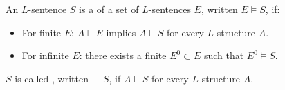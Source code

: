 An $L$-sentence $S$ is a  of a set of $L$-sentences $E$, written $E \vDash S$, if:
\begin{itemize}
\item For finite $E$: $A \vDash E$ implies $A \vDash S$ for every $L$-structure $A$.
\item For infinite $E$: there exists a finite $E^0 \subset E$ such that $E^0 \vDash S$.
\end{itemize}
$S$ is called , written $\vDash S$, if $A \vDash S$ for every $L$-structure $A$.
